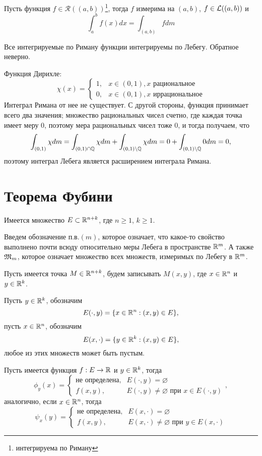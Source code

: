 \documentclass[main]{subfiles}
\begin{document}
\begin{theorem}
    Пусть функция $f \in \mathcal{R}((a,b))$\footnote{интегрируема по Риману}, тогда $f$ измерима на $(a, b)$, $f \in \mathcal{L}((a,b))$ и
    \[\int_{a}^{b} f(x) dx = \int_{(a, b)} f dm\]
\end{theorem}
Все интегрируемые по Риману функции интегрируемы по Лебегу.
Обратное неверно.
\begin{example}
    Функция Дирихле:
    \[\chi(x) = \begin{cases}
            1, & x \in (0, 1), x \text{ рациональное}   \\
            0, & x \in (0, 1), x \text{ иррациональное}
        \end{cases}\]
    Интеграл Римана от нее не существует.
    С другой стороны, функция принимает всего два значения; множество рациональных чисел счетно, где каждая точка имеет меру 0, поэтому мера рациональных чисел тоже 0, и тогда получаем, что
    \[\int_{(0, 1)} \chi dm = \int_{(0, 1) \cap \mathbb{Q}} \chi dm + \int_{(0, 1) \setminus \mathbb{Q}} \chi dm = 0 + \int_{(0, 1) \setminus \mathbb{Q}} 0 dm = 0,\]
    поэтому интеграл Лебега является расширением интеграла Римана.
\end{example}

\section{Теорема Фубини}

Имеется множество $E \subset \mathbb{R}^{n+k}$, где $n \ge 1$, $k \ge 1$.

Введем обозначение п.в.$(m)$, которое означает, что какое-то свойство выполнено почти всюду относительно меры Лебега в пространстве $\mathbb{R}^m$.
А также $\mathfrak{M}_m$, которое означает множество всех множеств, измеримых по Лебегу в $\mathbb{R}^m$.

Пусть имеется точка $M \in \mathbb{R}^{n+k}$, будем записывать $M(x, y)$, где $x \in \mathbb{R}^n$ и $y \in \mathbb{R}^k$.

Пусть $y \in \mathbb{R}^k$, обозначим
\[E(\cdot, y) = \{x \in \mathbb{R}^n: (x, y) \in E\},\]
пусть $x \in \mathbb{R}^n$, обозначим
\[E(x, \cdot) = \{y \in \mathbb{R}^k: (x, y) \in E\},\]
любое из этих множеств может быть пустым.

Пусть имеется функция $f: E \to \mathbb{R}$ и $y \in \mathbb{R}^k$, тогда
\[\phi_y(x) = \begin{cases}
        \text{не определена}, & E(\cdot, y) = \varnothing                                   \\
        f(x, y),              & E(\cdot, y) \neq \varnothing \text{ при } x \in E(\cdot, y)
    \end{cases},\]
аналогично, если $x \in \mathbb{R}^n$, тогда
\[\psi_x(y) = \begin{cases}
        \text{не определена}, & E(x, \cdot) = \varnothing                                   \\
        f(x, y),              & E(x, \cdot) \neq \varnothing \text{ при } y \in E(x, \cdot)
    \end{cases}\]
\end{document}
